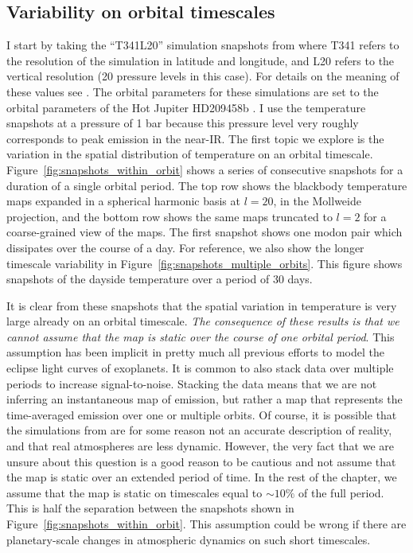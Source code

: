 \documentclass[12pt,dvipsnames]{report}
\begin{document}
\subsection{Variability on orbital timescales}
I start by taking the ``T341L20'' simulation snapshots from \citet{2021ApJ...913L..32C} 
where T341 refers to the resolution of the simulation in latitude and longitude, and 
L20 refers to the vertical resolution (20 pressure levels in this case). 
For details on the meaning of these values see \citet{2021MNRAS.504.5172S}. 
The orbital parameters for these simulations are set to the orbital parameters of the
Hot Jupiter HD209458b  \citep{2000ApJ...529L..41H,2000ApJ...529L..45C}. 
I use the temperature snapshots at a pressure of 1 bar because this pressure level very roughly 
corresponds to peak emission in the near-IR.
The first topic we explore is the variation in the spatial distribution of 
temperature on an orbital timescale. Figure~\ref{fig:snapshots_within_orbit} shows a series 
of consecutive snapshots for a duration of a single orbital period.
The top row shows the blackbody temperature maps expanded in a spherical harmonic basis 
at $l=20$, in the Mollweide projection, and the bottom row shows the same maps truncated 
to $l=2$ for a coarse-grained view of the maps. The first snapshot shows one modon pair
which dissipates over the course of a day. For reference, we also show the longer timescale
variability in Figure~\ref{fig:snapshots_multiple_orbits}. This figure shows snapshots 
of the dayside temperature over a period of 30 days. 


It is clear from these snapshots that the spatial variation in temperature is very large 
already on an orbital timescale. \emph{The consequence of these results is that we 
cannot assume that the map is static over the course of one orbital period}. This assumption
has been implicit in pretty much all previous efforts to model the eclipse light curves
of exoplanets. It is common to also stack data over multiple periods to increase 
signal-to-noise. Stacking the data means that we are not inferring 
an instantaneous map of emission, but rather a map that represents the time-averaged emission over 
one or multiple orbits. Of course, it is possible that the simulations from 
\citet{2021ApJ...913L..32C} are for some reason not an accurate description of reality,
and that real atmospheres are less dynamic. However, the very fact that we are unsure 
about this question is a good reason to be cautious and not assume that the map is static over an 
extended period of time. In the rest of the chapter, we assume that the map is static on 
timescales equal to $\sim10\%$ of the full period. This is half the separation 
between the snapshots shown in Figure~\ref{fig:snapshots_within_orbit}. This 
assumption could be wrong if there are planetary-scale changes in atmospheric dynamics 
on such short timescales.
\end{document}
